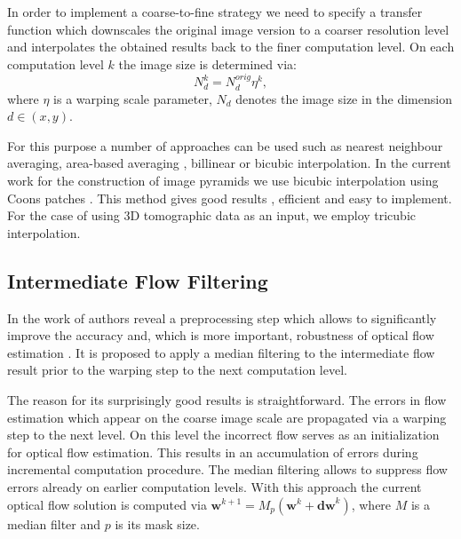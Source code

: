 In order to implement a coarse-to-fine strategy we need to specify a transfer function which downscales the original image version to a coarser resolution level and interpolates the obtained results back to the finer computation level. 
On each computation level $k$ the image size is determined via:
$$ N^k_{d} = N^{orig} _{d} \eta^k,$$
where $\eta$ is a warping scale parameter, $N_d$ denotes the image size in the dimension $d \in (x,y)$.

For this purpose a number of approaches can be used such as nearest neighbour averaging, area-based averaging \cite{Bruhn05}, billinear or bicubic interpolation. 
In the current work for the construction of image pyramids we use bicubic interpolation using Coons patches \cite{Coons67}. This method gives good results \cite{Sun14, HarmonyFlow}, efficient and easy to implement. For the case of using 3D tomographic data as an input, we employ tricubic interpolation.



\subsection{Intermediate Flow Filtering}
\label{flow_median}

In the work of \cite{Sun10, Sun14} authors reveal a preprocessing step which allows to significantly improve the accuracy and, which  is more important, robustness of optical flow estimation \cite{Wedel09}. It is proposed to apply a median filtering to the intermediate flow result prior to the warping step to the next computation level.

The reason for its surprisingly good results is straightforward. The errors in flow estimation which appear on the coarse image scale are propagated via a warping step to the next level. On this level the incorrect flow serves as an initialization for optical flow estimation.  This results in an accumulation of errors during incremental computation procedure. The median filtering allows to suppress flow errors already on earlier computation levels. With this approach the current optical flow solution is computed via $\textbf{w}^{k+1} = M_p (\textbf{w}^{k} +\textbf{dw}^{k})$, where $M$ is a median filter and $p$ is its mask size. 

